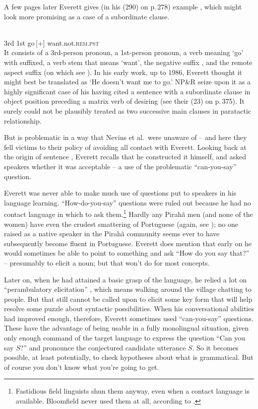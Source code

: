 \documentclass[output=paper,colorlinks,citecolor=brown
]{langscibook}
\begin{document}
A few pages later Everett gives (in his (290) on p.\,278) example ,
which might look more promising as a case of a subordinate clause.

\ea\label{ex:pullum:3}
\gll {}    
            \\
         3rd 1st go\,[+] want.not.\textsc{rem.pst}\\
\z
\noindent
It consists of a 3rd-person pronoun, a 1st-person pronoun, a
verb meaning `go' with \mbox{} suffixed, a verb stem that
means `want', the negative suffix , and the remote aspect
suffix  (on which see \citealt[293--294]{Everett86HAL}). In
his early work, up to 1986, Everett thought it might best be translated
as `He doesn't want me to go.' NP\&R seize upon it as a highly significant
case of his having cited a sentence with a subordinate clause in
object position preceding a matrix verb of desiring (see their (23)
on p.\,375). It surely could not be plausibly treated as two successive
main clauses in paratactic relationship.

But  is problematic in a way that Nevins et al.\ were unaware
of -- and here they fell victims to their policy of avoiding all contact
with Everett. Looking back at the origin of sentence , Everett recalls
that he constructed it himself, and asked speakers whether it was
acceptable -- a use of the problematic ``can-you-say'' question.

Everett was never able to make much use of questions put to speakers
in his language learning.  ``How-do-you-say'' questions \parencites[114, Ch~6]{Samarin67}[{\textsection}6.4]{SakeEver12} were ruled out because he had no contact language in
which to ask them.\footnote{%
   Fastidious field linguists shun them anyway, even when a contact language
   is available. Bloomfield never used them at all, according to
   .}
Hardly any Pirah{\~a} men (and none of the women) have even the crudest
smattering of Portuguese (again, see \citealt{Sakel12}); no one raised
as a native speaker in the Pirah{\~a} community seems ever to have
subsequently become fluent in Portuguese. Everett does mention that
early on he would sometimes be able to point to something and ask
``How do you say that?'' \citep[20]{Everett08} -- presumably
to elicit a noun; but that won't do for most concepts.

Later on, when he had attained a basic grasp of the language, he relied
a lot on ``perambulatory elicitation'' \citep[200]{Everett86HAL}, which
means walking around the village chatting to people. But that still
cannot be called upon to elicit some key form that will help resolve
some puzzle about syntactic possibilities. When his conversational
abilities had improved enough, therefore, Everett sometimes used
``can-you-say'' questions. These have the advantage of being usable in
a fully monolingual situation, given only enough command of the target
language to express the question ``Can you say $S$?'' and pronounce the
conjectured candidate utterance $S$. So it becomes possible, at least
potentially, to check hypotheses about what is grammatical. But of
course you don't know what you're going to get.
\end{document}
